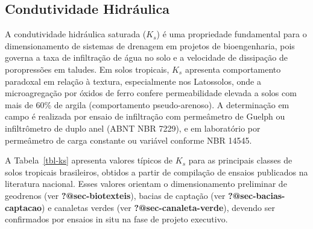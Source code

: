 \documentclass[
  portuguese,
  11pt,
  a4paper,
  open=any]{scrbook}
\begin{document}
\subsection{Condutividade Hidráulica}\label{condutividade-hidruxe1ulica}

A condutividade hidráulica saturada (\(K_s\)) é uma propriedade
fundamental para o dimensionamento de sistemas de drenagem em projetos
de bioengenharia, pois governa a taxa de infiltração de água no solo e a
velocidade de dissipação de poropressões em taludes. Em solos tropicais,
\(K_s\) apresenta comportamento paradoxal em relação à textura,
especialmente nos Latossolos, onde a microagregação por óxidos de ferro
confere permeabilidade elevada a solos com mais de 60\% de argila
(comportamento pseudo-arenoso). A determinação em campo é realizada por
ensaio de infiltração com permeâmetro de Guelph ou infiltrômetro de
duplo anel (ABNT NBR 7229), e em laboratório por permeâmetro de carga
constante ou variável conforme NBR 14545.

A Tabela~\ref{tbl-ks} apresenta valores típicos de \(K_s\) para as
principais classes de solos tropicais brasileiros, obtidos a partir de
compilação de ensaios publicados na literatura nacional. Esses valores
orientam o dimensionamento preliminar de geodrenos (ver
\textbf{?@sec-biotexteis}), bacias de captação (ver
\textbf{?@sec-bacias-captacao}) e canaletas verdes (ver
\textbf{?@sec-canaleta-verde}), devendo ser confirmados por ensaios in
situ na fase de projeto executivo.
\end{document}
